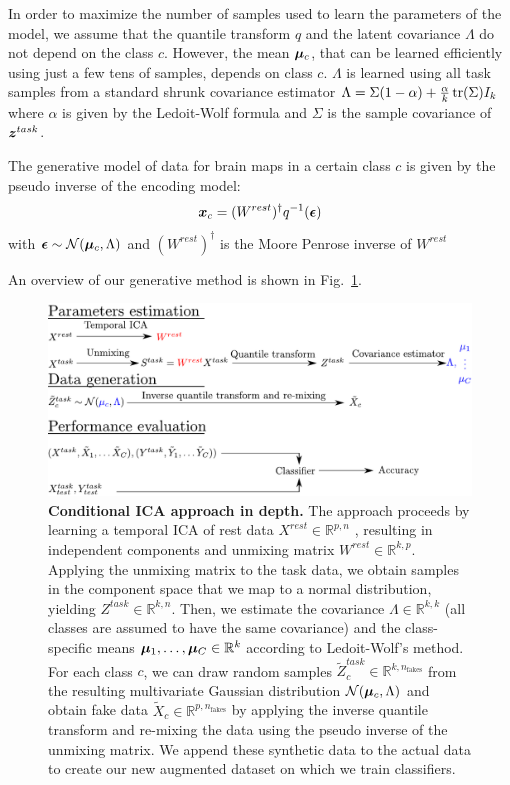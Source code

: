 In order to maximize the number of samples used to learn the parameters of the
model, we assume that the quantile transform $q$ and the latent covariance
$\Lambda$ do not depend on the class $c$. However, the mean $\boldsymbol{\mu}_c$, that can be learned efficiently using just a few tens of samples, depends on class $c$.
$\Lambda$ is learned using all task samples from a standard shrunk covariance
estimator
$\Lambda = \Sigma (1 - \alpha) + \frac{\alpha}{k} \mathop{\mathrm{tr}}(\Sigma) I_k$ where
$\alpha$ is given by the Ledoit-Wolf formula \cite{ledoit2004well} and
$\Sigma$ is the sample covariance of $\boldsymbol{z}^{task}$.

The generative model of data for brain maps in a certain class $c$ is given by the pseudo inverse of the encoding model:
\begin{equation}
  \boldsymbol{x}_c = (W^{rest})^{\dagger} q^{-1}(\boldsymbol{\epsilon})
\end{equation}
with $\boldsymbol{\epsilon} \sim \mathcal{N}(\boldsymbol{\mu}_c, \Lambda)$ and $(W^{rest})^{\dagger}$ is
the Moore Penrose inverse of $W^{rest}$

An overview of our generative method is shown in Fig.~\ref{Fig11}.
%
\begin{figure}
\centerline{\includegraphics[width=1\textwidth]{figures/condica/method_figure}}
\caption{\textbf{Conditional ICA approach in depth.} 
The approach proceeds by learning a temporal ICA of rest data $X^{rest} \in
\mathbb{R}^{p, n}$ , resulting in
independent components and unmixing matrix $W^{rest} \in \mathbb{R}^{k, p}$.
%
Applying the unmixing matrix to the task data, we obtain samples in the component
space that we map to a normal distribution, yielding $Z^{task} \in
\mathbb{R}^{k, n}$. 
%
Then, we estimate the covariance $\Lambda \in \mathbb{R}^{k, k}$ (all classes are assumed to have the
same covariance) and the class-specific means $\boldsymbol{\mu}_1, \dots, \boldsymbol{\mu}_C \in \mathbb{R}^{k}$ according to Ledoit-Wolf's method.
%
For each class $c$, we can draw random samples $\tilde{Z}^{task}_c \in
\mathbb{R}^{k, n_{\mathrm{fakes}}}$ from the
resulting multivariate Gaussian distribution $\mathcal{N}(\boldsymbol{\mu}_c, \Lambda)$ and
obtain fake data $\tilde{X}_c  \in
\mathbb{R}^{p, n_{\mathrm{fakes}}}$
by applying the inverse quantile transform and re-mixing the data using the pseudo inverse of the unmixing matrix.
%
We append these synthetic data to the actual data to create our new augmented
dataset on which we train classifiers.}
\label{Fig11}
\end{figure}
%

